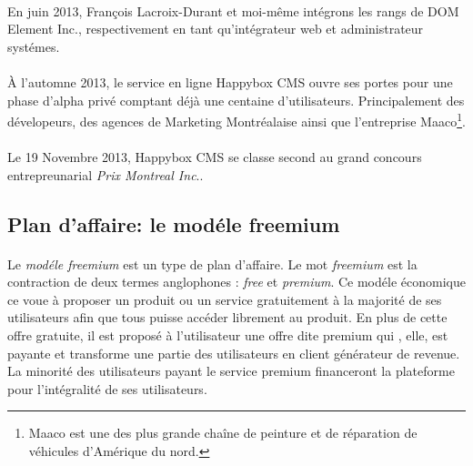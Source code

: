 \documentclass[11pt, a4paper ]{article}
\begin{document}
\begin{spacing}{1.5}

\paragraph{}
En juin 2013, François Lacroix-Durant et moi-même intégrons les rangs de DOM Element Inc., respectivement en tant qu'intégrateur web et administrateur systémes.

\paragraph{} %


\paragraph{}
À l'automne 2013, le service en ligne Happybox CMS ouvre ses portes pour une phase d'alpha privé comptant déjà une centaine d'utilisateurs. Principalement des dévelopeurs, des agences de Marketing Montréalaise ainsi que l'entreprise Maaco\footnote{Maaco est une des plus grande chaîne de peinture et de réparation de véhicules d'Amérique du nord.}.

\paragraph{}
Le 19 Novembre 2013, Happybox CMS se classe second au grand concours entrepreunarial \emph{Prix Montreal Inc}..


			\subsection{Plan d'affaire: le modéle freemium} %

\paragraph{}
Le \emph{modéle freemium} est un type de plan d'affaire. Le mot \emph{freemium} est la contraction de deux termes anglophones : \emph{free} et \emph{premium}. Ce modéle économique ce voue à proposer un produit ou un service gratuitement à la majorité de ses utilisateurs afin que tous puisse accéder librement au produit. En plus de cette offre gratuite, il est proposé à l'utilisateur une offre dite premium qui , elle, est payante et transforme une partie des utilisateurs en client générateur de revenue. La minorité des utilisateurs payant le service premium financeront la plateforme pour l'intégralité de ses utilisateurs.



\end{spacing}
\end{document}

